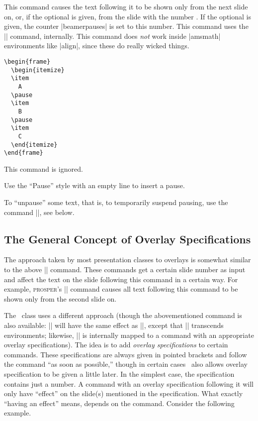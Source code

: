 \begin{command}{\pause{}}
  This command causes the text following it to be shown only from the
  next slide on, or, if the optional  is given,
  from the slide with the number . If the optional
   is given, the counter |beamerpauses| is set to this
  number. This command uses the |\onslide| command, internally.
  This command does \emph{not} work inside |amsmath| environments like
  |align|, since these do really wicked things.

  \example
\begin{verbatim}
\begin{frame}
  \begin{itemize}
  \item
    A
  \pause
  \item
    B
  \pause
  \item
    C
  \end{itemize}
\end{frame}
\end{verbatim}

  \articlenote
  This command is ignored.

  \lyxnote
  Use the ``Pause'' style with an empty line to insert a pause.
\end{command}

To ``unpause'' some text, that is, to temporarily suspend pausing, use
the command |\onslide|, see below.






\subsection{The General Concept of Overlay Specifications}

\label{section-concept-overlays}

The approach taken by most presentation classes to overlays is
somewhat similar to the above |\pause| command. These commands get a
certain slide number as input and affect the text on the slide
following this command in a certain way. For example,
\textsc{prosper}'s || command causes all text following
this command to be shown only from the second slide on.

The \beamer\ class uses a different approach (though the
abovementioned command is also available: || will have the
same effect as ||, except that |\onslide| transcends
environments; likewise, |\pause| is internally mapped to a command
with an appropriate overlay specifications). The idea is to add
\emph{overlay specifications} to certain commands. These
specifications are always given in pointed
brackets and follow the command ``as soon as possible,'' though in
certain cases \beamer\ also allows overlay specification to be
given a little later. In the simplest case, the specification contains
just a number. A command with an overlay
specification following it will only have ``effect'' on the slide(s)
mentioned in the specification. What exactly ``having an effect''
means, depends on the command. Consider the following example.

